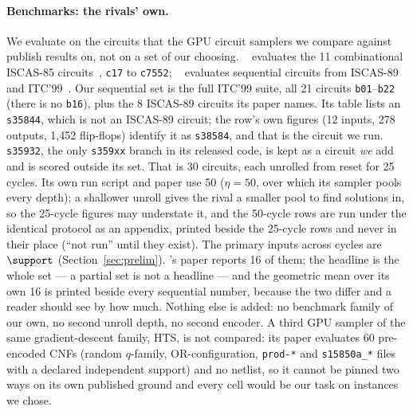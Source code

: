 \paragraph{Benchmarks: the rivals' own.}
We evaluate on the circuits that the GPU circuit samplers we compare against publish results
on, not on a set of our choosing. \demotic{}~\cite{demotic} evaluates the 11 combinational
ISCAS-85 circuits~\cite{brglez_iscas85_1985}, \texttt{c17} to \texttt{c7552};
\recurrent{}~\cite{recurrent} evaluates sequential circuits from
ISCAS-89~\cite{brglez_iscas89_1989} and ITC'99~\cite{corno_itc99_2000}. Our sequential set is
the full ITC'99 suite, all 21 circuits \texttt{b01}--\texttt{b22} (there is no \texttt{b16}),
plus the 8 ISCAS-89 circuits its paper names. Its table lists an \texttt{s35844}, which is not an
ISCAS-89 circuit; the row's own figures (12 inputs, 278 outputs, 1{,}452 flip-flops) identify it
as \texttt{s38584}, and that is the circuit we run. \texttt{s35932}, the only \texttt{s359xx}
branch in its released code, is kept as a circuit \emph{we} add and is scored outside its set.
That is 30 circuits, each unrolled from reset for 25 cycles. Its own run script and paper use
50 ($\eta = 50$, over which its sampler pools every depth); a shallower unroll gives the rival a
smaller pool to find solutions in, so the 25-cycle figures may understate it, and the 50-cycle
rows are run under the identical protocol as an appendix, printed beside the 25-cycle rows and
never in their place (``not run'' until they exist). The primary inputs across cycles are $\support$ (Section~\ref{sec:prelim}). \recurrent{}'s paper reports 16 of them; the headline is the
whole set --- a partial set is not a headline --- and the geometric mean over its own 16 is
printed beside every sequential number, because the two differ and a reader should see by how
much. Nothing else is added: no benchmark family of our
own, no second unroll depth, no second encoder. A third GPU sampler of the same
gradient-descent family, HTS, is not compared: its paper evaluates 60 pre-encoded CNFs (random
$q$-family, OR-configuration, \texttt{prod-*} and \texttt{s15850a\_*} files with a declared
independent support) and no netlist, so it cannot be pinned two ways on its own published
ground and every cell would be our task on instances we chose.

